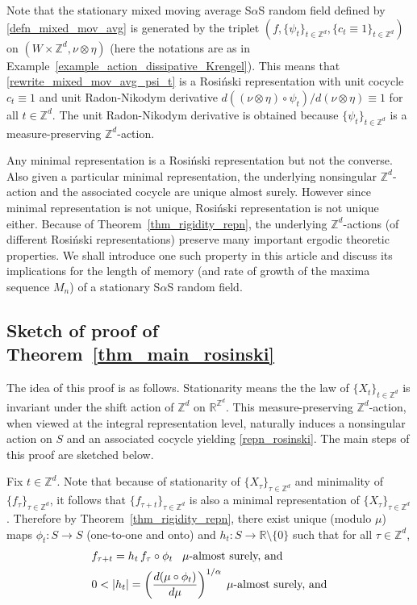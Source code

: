 \documentclass[12pt]{amsart}
\begin{document}
Note that the stationary mixed moving average S$\alpha$S random field defined by \eqref{defn_mixed_mov_avg} is generated by the triplet $\left(f, \{\psi_t\}_{t \in {\mathbb{Z}^d}}, \{c_t \equiv 1\}_{t \in {\mathbb{Z}^d}}\right)$ on $(W \times {\mathbb{Z}^d}, \nu \otimes \eta)$ (here the notations are as in Example~\ref{example_action_dissipative_Krengel}). This means that \eqref{rewrite_mixed_mov_avg_psi_t} is a Rosi\'{n}ski representation with unit cocycle $c_t \equiv 1$ and unit Radon-Nikodym derivative $d((\nu \otimes \eta)\circ \psi_t)/d(\nu \otimes \eta) \equiv 1$ for all $t \in {\mathbb{Z}^d}$. The unit Radon-Nikodym derivative is obtained because $\{\psi_t\}_{t \in {\mathbb{Z}^d}}$  is a measure-preserving ${\mathbb{Z}^d}$-action.

Any minimal representation is a Rosi\'{n}ski representation but not the converse. Also given a particular minimal representation, the underlying nonsingular ${\mathbb{Z}^d}$-action and the associated cocycle are unique almost surely. However since minimal representation is not unique, Rosi\'{n}ski representation is not unique either. Because of Theorem~\ref{thm_rigidity_repn}, the underlying ${\mathbb{Z}^d}$-actions (of different Rosi\'{n}ski representations) preserve many important ergodic theoretic properties. We shall introduce one such property in this article and discuss its implications for the length of memory (and rate of growth of the maxima sequence $M_n$) of a stationary S$\alpha$S random field.

\subsection{Sketch of proof of Theorem~\ref{thm_main_rosinski}} \label{subsec:proof_main_rosinski}

The idea of this proof is as follows. Stationarity means the the law of ${\{X_t\}_{t \in \mathbb{Z}^d}}$ is invariant under the shift action of ${\mathbb{Z}^d}$ on $\mathbb{R}^{\mathbb{Z}^d}$. This measure-preserving ${\mathbb{Z}^d}$-action, when viewed at the integral representation level, naturally induces a nonsingular action on $S$ and an associated cocycle yielding \eqref{repn_rosinski}. The main steps of this proof are sketched below.

Fix $t \in {\mathbb{Z}^d}$. Note that because of stationarity of $\{X_{\tau}\}_{\tau \in {\mathbb{Z}^d}}$ and minimality of $\{f_{\tau}\}_{\tau \in {\mathbb{Z}^d}}$, it follows that $\{f_{\tau+t}\}_{\tau \in {\mathbb{Z}^d}}$ is also a minimal representation of $\{X_{\tau}\}_{\tau \in {\mathbb{Z}^d}}$. Therefore by Theorem~\ref{thm_rigidity_repn}, there exist unique (modulo $\mu$) maps $\phi_t:S \to S$ (one-to-one and onto) and $h_t:S \to \mathbb{R}\setminus\{0\}$ such that for all $\tau \in {\mathbb{Z}^d}$,
\begin{align}
&f_{\tau+t}=h_t\, f_\tau \circ \phi_t \mbox{\;\;\;$\mu$-almost surely, and}\label{reln_f_taut_and_f_tau} \\
&0<|h_t|=\left(\frac{d(\mu \circ \phi_t)}{d\mu}\right)^{1/\alpha}\mbox{\;$\mu$-almost surely, and}\label{form_of_h_t}
\end{align}
\end{document}

